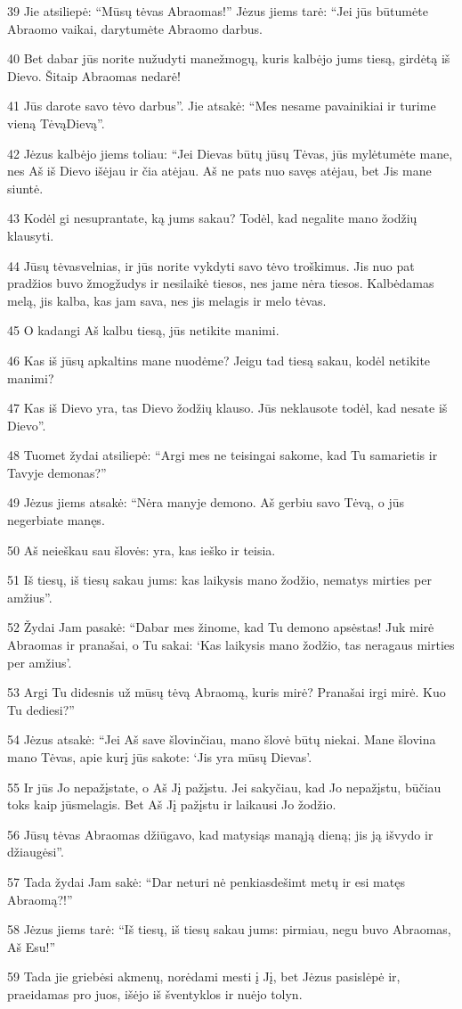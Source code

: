 \par 39 Jie atsiliepė: “Mūsų tėvas Abraomas!” Jėzus jiems tarė: “Jei jūs būtumėte Abraomo vaikai, darytumėte Abraomo darbus. 
\par 40 Bet dabar jūs norite nužudyti mane­žmogų, kuris kalbėjo jums tiesą, girdėtą iš Dievo. Šitaip Abraomas nedarė! 
\par 41 Jūs darote savo tėvo darbus”. Jie atsakė: “Mes nesame pavainikiai ir turime vieną Tėvą­Dievą”. 
\par 42 Jėzus kalbėjo jiems toliau: “Jei Dievas būtų jūsų Tėvas, jūs mylėtumėte mane, nes Aš iš Dievo išėjau ir čia atėjau. Aš ne pats nuo savęs atėjau, bet Jis mane siuntė. 
\par 43 Kodėl gi nesuprantate, ką jums sakau? Todėl, kad negalite mano žodžių klausyti. 
\par 44 Jūsų tėvas­velnias, ir jūs norite vykdyti savo tėvo troškimus. Jis nuo pat pradžios buvo žmogžudys ir nesilaikė tiesos, nes jame nėra tiesos. Kalbėdamas melą, jis kalba, kas jam sava, nes jis melagis ir melo tėvas. 
\par 45 O kadangi Aš kalbu tiesą, jūs netikite manimi. 
\par 46 Kas iš jūsų apkaltins mane nuodėme? Jeigu tad tiesą sakau, kodėl netikite manimi? 
\par 47 Kas iš Dievo yra, tas Dievo žodžių klauso. Jūs neklausote todėl, kad nesate iš Dievo”. 
\par 48 Tuomet žydai atsiliepė: “Argi mes ne teisingai sakome, kad Tu samarietis ir Tavyje demonas?” 
\par 49 Jėzus jiems atsakė: “Nėra manyje demono. Aš gerbiu savo Tėvą, o jūs negerbiate manęs. 
\par 50 Aš neieškau sau šlovės: yra, kas ieško ir teisia. 
\par 51 Iš tiesų, iš tiesų sakau jums: kas laikysis mano žodžio, nematys mirties per amžius”. 
\par 52 Žydai Jam pasakė: “Dabar mes žinome, kad Tu demono apsėstas! Juk mirė Abraomas ir pranašai, o Tu sakai: ‘Kas laikysis mano žodžio, tas neragaus mirties per amžius’. 
\par 53 Argi Tu didesnis už mūsų tėvą Abraomą, kuris mirė? Pranašai irgi mirė. Kuo Tu dediesi?” 
\par 54 Jėzus atsakė: “Jei Aš save šlovinčiau, mano šlovė būtų niekai. Mane šlovina mano Tėvas, apie kurį jūs sakote: ‘Jis yra mūsų Dievas’. 
\par 55 Ir jūs Jo nepažįstate, o Aš Jį pažįstu. Jei sakyčiau, kad Jo nepažįstu, būčiau toks kaip jūs­melagis. Bet Aš Jį pažįstu ir laikausi Jo žodžio. 
\par 56 Jūsų tėvas Abraomas džiūgavo, kad matysiąs manąją dieną; jis ją išvydo ir džiaugėsi”. 
\par 57 Tada žydai Jam sakė: “Dar neturi nė penkiasdešimt metų ir esi matęs Abraomą?!” 
\par 58 Jėzus jiems tarė: “Iš tiesų, iš tiesų sakau jums: pirmiau, negu buvo Abraomas, Aš Esu!” 
\par 59 Tada jie griebėsi akmenų, norėdami mesti į Jį, bet Jėzus pasislėpė ir, praeidamas pro juos, išėjo iš šventyklos ir nuėjo tolyn.


